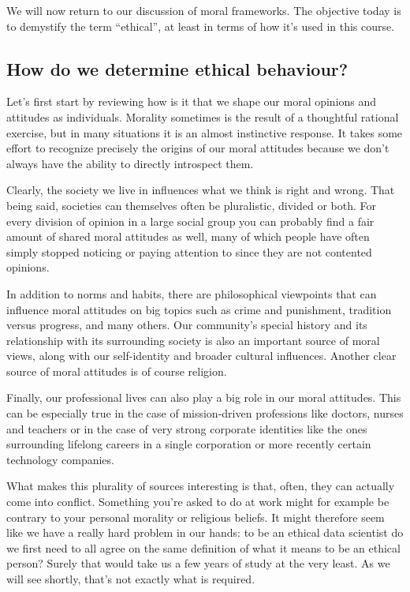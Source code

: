 \documentclass[
]{book}
\theoremstyle{definition}
\theoremstyle{definition}
\theoremstyle{definition}
\theoremstyle{definition}
\theoremstyle{remark}
\begin{document}
We will now return to our discussion of moral frameworks. The objective today is to demystify the term ``ethical'', at least in terms of how it's used in this course.

\hypertarget{how-do-we-determine-ethical-behaviour}{%
\subsection{How do we determine ethical behaviour?}\label{how-do-we-determine-ethical-behaviour}}

Let's first start by reviewing how is it that we shape our moral opinions and attitudes as individuals. Morality sometimes is the result of a thoughtful rational exercise, but in many situations it is an almost instinctive response. It takes some effort to recognize precisely the origins of our moral attitudes because we don't always have the ability to directly introspect them.

Clearly, the society we live in influences what we think is right and wrong. That being said, societies can themselves often be pluralistic, divided or both. For every division of opinion in a large social group you can probably find a fair amount of shared moral attitudes as well, many of which people have often simply stopped noticing or paying attention to since they are not contented opinions.

In addition to norms and habits, there are philosophical viewpoints that can influence moral attitudes on big topics such as crime and punishment, tradition versus progress, and many others. Our community's special history and its relationship with its surrounding society is also an important source of moral views, along with our self-identity and broader cultural influences. Another clear source of moral attitudes is of course religion.

Finally, our professional lives can also play a big role in our moral attitudes. This can be especially true in the case of mission-driven professions like doctors, nurses and teachers or in the case of very strong corporate identities like the ones surrounding lifelong careers in a single corporation or more recently certain technology companies.

What makes this plurality of sources interesting is that, often, they can actually come into conflict. Something you're asked to do at work might for example be contrary to your personal morality or religious beliefs. It might therefore seem like we have a really hard problem in our hands: to be an ethical data scientist do we first need to all agree on the same definition of what it means to be an ethical person? Surely that would take us a few years of study at the very least. As we will see shortly, that's not exactly what is required.
\end{document}
